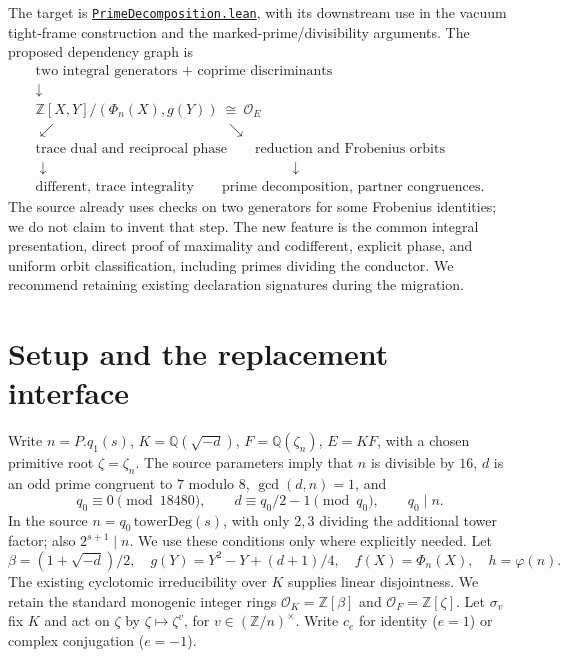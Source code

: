 \documentclass[11pt]{article}
\newcommand{\Z}{\mathbb Z}\newcommand{\Q}{\mathbb Q}\newcommand{\F}{\mathbb F}\newcommand{\OO}{\mathcal O}\newcommand{\Tr}{\operatorname{Tr}}\newcommand{\ord}{\operatorname{ord}}\newcommand{\lcm}{\operatorname{lcm}}\newcommand{\codiff}{\mathfrak D^{-1}}\newcommand{\src}[2]{\href{https://github.com/VladimirReshetnikov/ProveIt/blob/fd695fd462aa31b25af3335e2a9c3b6e014b055f/Analysis/GeneralizedRiemannHypothesis/Lean/grh/src/#1}{#2}}
\begin{document}
The target is \src{New/Derivatives/Field/PrimeDecomposition.lean}{\texttt{PrimeDecomposition.lean}}, with its downstream use in the vacuum tight-frame construction and the marked-prime/divisibility arguments. The proposed dependency graph is
\[
\begin{gathered}
\text{two integral generators + coprime discriminants}\\
\downarrow\\
\Z[X,Y]/(\Phi_n(X),g(Y))\ \cong\ \OO_E\\
\swarrow\hspace{12em}\searrow\\[-2pt]
\text{trace dual and reciprocal phase}\qquad\text{reduction and Frobenius orbits}\\
\downarrow\hspace{17em}\downarrow\\
\text{different, trace integrality}\qquad\text{prime decomposition, partner congruences.}
\end{gathered}
\]
The source already uses checks on two generators for some Frobenius identities; we do not claim to invent that step. The new feature is the common integral presentation, direct proof of maximality and codifferent, explicit phase, and uniform orbit classification, including primes dividing the conductor. We recommend retaining existing declaration signatures during the migration.

\section{Setup and the replacement interface}
Write $n=P.q_1(s)$, $K=\Q(\sqrt{-d})$, $F=\Q(\zeta_n)$, $E=KF$, with a chosen primitive root $\zeta=\zeta_n$. The source parameters imply that $n$ is divisible by $16$, $d$ is an odd prime congruent to $7$ modulo $8$, $\gcd(d,n)=1$, and
\[
q_0\equiv0\pmod {18480},\qquad d\equiv q_0/2-1\pmod {q_0},\qquad q_0\mid n.
\]
In the source $n=q_0\,\mathrm{towerDeg}(s)$, with only $2,3$ dividing the additional tower factor; also $2^{s+1}\mid n$. We use these conditions only where explicitly needed. Let
\[
\beta=(1+\sqrt{-d})/2,\quad g(Y)=Y^2-Y+(d+1)/4,
\quad f(X)=\Phi_n(X),\quad h=\varphi(n).
\]
The existing cyclotomic irreducibility over $K$ supplies linear disjointness. We retain the standard monogenic integer rings $\OO_K=\Z[\beta]$ and $\OO_F=\Z[\zeta]$. Let $\sigma_v$ fix $K$ and act on $\zeta$ by $\zeta\mapsto\zeta^v$, for $v\in(\Z/n)^\times$. Write $c_e$ for identity ($e=1$) or complex conjugation ($e=-1$).
\end{document}
